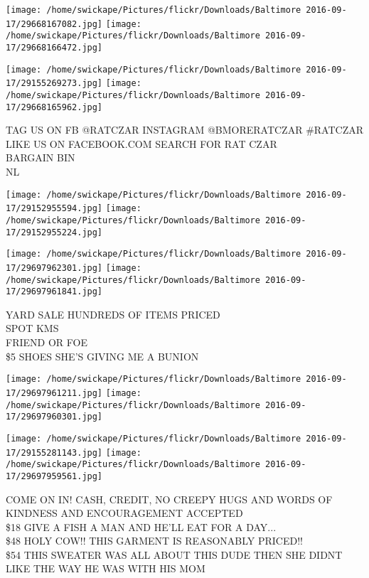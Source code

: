 \documentclass[10pt,letterpaper]{article}
\begin{document}
\texttt{[image: /home/swickape/Pictures/flickr/Downloads/Baltimore 2016-09-17/29668167082.jpg]}
\texttt{[image: /home/swickape/Pictures/flickr/Downloads/Baltimore 2016-09-17/29668166472.jpg]}

\texttt{[image: /home/swickape/Pictures/flickr/Downloads/Baltimore 2016-09-17/29155269273.jpg]}
\texttt{[image: /home/swickape/Pictures/flickr/Downloads/Baltimore 2016-09-17/29668165962.jpg]}

TAG US ON FB @RATCZAR INSTAGRAM @BMORERATCZAR \#RATCZAR\\
LIKE US ON FACEBOOK.COM SEARCH FOR RAT CZAR\\
BARGAIN BIN\\
NL
\pagebreak

\texttt{[image: /home/swickape/Pictures/flickr/Downloads/Baltimore 2016-09-17/29152955594.jpg]}
\texttt{[image: /home/swickape/Pictures/flickr/Downloads/Baltimore 2016-09-17/29152955224.jpg]}

\texttt{[image: /home/swickape/Pictures/flickr/Downloads/Baltimore 2016-09-17/29697962301.jpg]}
\texttt{[image: /home/swickape/Pictures/flickr/Downloads/Baltimore 2016-09-17/29697961841.jpg]}

YARD SALE HUNDREDS OF ITEMS PRICED\\
SPOT KMS\\
FRIEND OR FOE\\
\$5 SHOES SHE'S GIVING ME A BUNION
\pagebreak

\texttt{[image: /home/swickape/Pictures/flickr/Downloads/Baltimore 2016-09-17/29697961211.jpg]}
\texttt{[image: /home/swickape/Pictures/flickr/Downloads/Baltimore 2016-09-17/29697960301.jpg]}

\texttt{[image: /home/swickape/Pictures/flickr/Downloads/Baltimore 2016-09-17/29155281143.jpg]}
\texttt{[image: /home/swickape/Pictures/flickr/Downloads/Baltimore 2016-09-17/29697959561.jpg]}

COME ON IN!  CASH, CREDIT, NO CREEPY HUGS AND WORDS OF KINDNESS AND ENCOURAGEMENT ACCEPTED\\
\$18 GIVE A FISH A MAN AND HE'LL EAT FOR A DAY...\\
\$48 HOLY COW!! THIS GARMENT IS REASONABLY PRICED!!\\
\$54 THIS SWEATER WAS ALL ABOUT THIS DUDE THEN SHE DIDNT LIKE THE WAY HE WAS WITH HIS MOM
\pagebreak
\end{document}
